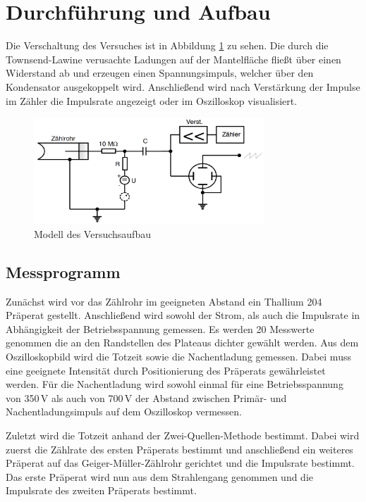 \section{Durchführung und Aufbau}
\label{sec:Durchführung}
Die Verschaltung des Versuches ist in Abbildung \ref{fig:Aufbau} zu sehen. Die durch die Townsend-Lawine verusachte Ladungen auf der Mantelfläche fließt über einen Widerstand ab und erzeugen einen Spannungsimpuls, welcher über den Kondensator ausgekoppelt wird. Anschließend wird nach Verstärkung der Impulse im Zähler die Impulsrate angezeigt oder im Oszilloskop visualisiert.
\begin{figure}
  \centering
  \includegraphics[height=4cm]{picture/Aufbau.pdf}
  \caption{Modell des Versuchsaufbau \cite{sample}}
  \label{fig:Aufbau}
\end{figure}
\subsection{Messprogramm}
Zunächst wird vor das Zählrohr im geeigneten Abstand ein Thallium 204 Präperat gestellt. Anschließend wird sowohl der Strom, als auch die Impulsrate in Abhängigkeit der Betriebsspannung gemessen. Es werden 20 Messwerte genommen die an den Randstellen des Plateaus dichter gewählt werden.
Aus dem Oszilloskopbild wird die Totzeit sowie die Nachentladung gemessen. Dabei muss eine geeignete Intensität durch Positionierung des Präperats gewährleistet werden. Für die Nachentladung wird sowohl einmal für eine Betriebsspannung von 350\,V als auch von 700\,V der Abstand zwischen Primär- und Nachentladungsimpuls auf dem Oszilloskop vermessen.

Zuletzt wird die Totzeit anhand der Zwei-Quellen-Methode bestimmt. Dabei wird zuerst die Zählrate des ersten Präperats bestimmt und anschließend ein weiteres Präperat auf das Geiger-Müller-Zählrohr gerichtet und die Impulsrate bestimmt. Das erste Präperat wird nun aus dem Strahlengang genommen und die Impulsrate des zweiten Präperats bestimmt.
